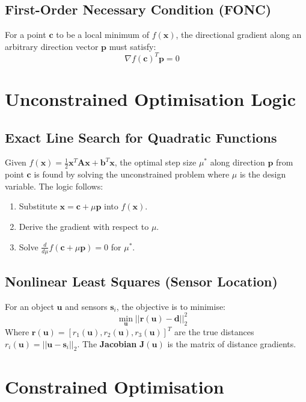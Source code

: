 \documentclass[11pt]{article}
\begin{document}
\subsection{First-Order Necessary Condition (FONC)}
For a point $\mathbf{c}$ to be a local minimum of $f(\mathbf{x})$, the directional gradient along an arbitrary direction vector $\mathbf{p}$ must satisfy:
\begin{equation}
\nabla f(\mathbf{c})^T \mathbf{p} = 0 \quad
\end{equation}

\section{Unconstrained Optimisation Logic}

\subsection{Exact Line Search for Quadratic Functions}
Given $f(\mathbf{x}) = \frac{1}{2}\mathbf{x}^T \mathbf{A} \mathbf{x} + \mathbf{b}^T \mathbf{x}$, the optimal step size $\mu^*$ along direction $\mathbf{p}$ from point $\mathbf{c}$ is found by solving the unconstrained problem where $\mu$ is the design variable. 
The logic follows:
\begin{enumerate}
    \item Substitute $\mathbf{x} = \mathbf{c} + \mu\mathbf{p}$ into $f(\mathbf{x})$.
    \item Derive the gradient with respect to $\mu$.
    \item Solve $\frac{d}{d\mu}f(\mathbf{c} + \mu\mathbf{p}) = 0$ for $\mu^*$.
\end{enumerate}

\subsection{Nonlinear Least Squares (Sensor Location)}
For an object $\mathbf{u}$ and sensors $\mathbf{s}_i$, the objective is to minimise:
\begin{equation}
\min_{\mathbf{u}} ||\mathbf{r}(\mathbf{u}) - \mathbf{d}||_2^2 \quad
\end{equation}
Where $\mathbf{r}(\mathbf{u}) = [r_1(\mathbf{u}), r_2(\mathbf{u}), r_3(\mathbf{u})]^T$ are the true distances $r_i(\mathbf{u}) = ||\mathbf{u} - \mathbf{s}_i||_2$. The \textbf{Jacobian} $\mathbf{J}(\mathbf{u})$ is the matrix of distance gradients.

\section{Constrained Optimisation}
\end{document}
